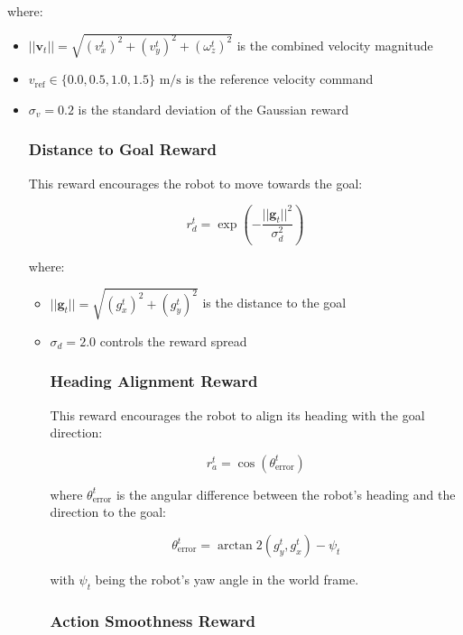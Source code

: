 \documentclass[12pt,a4paper]{article}
\begin{document}
where:
\begin{itemize}
\item $||\mathbf{v}_t|| = \sqrt{(v_x^t)^2 + (v_y^t)^2 + (\omega_z^t)^2}$ is the combined velocity magnitude
\item $v_{\text{ref}} \in \{0.0, 0.5, 1.0, 1.5\} \text{ m/s}$ is the reference velocity command
\item $\sigma_v = 0.2$ is the standard deviation of the Gaussian reward

\subsubsection{Distance to Goal Reward}

This reward encourages the robot to move towards the goal:

\begin{equation}
r_d^t = \exp\left( -\frac{||\mathbf{g}_t||^2}{\sigma_d^2} \right)
\end{equation}

where:
\begin{itemize}
\item $||\mathbf{g}_t|| = \sqrt{(g_x^t)^2 + (g_y^t)^2}$ is the distance to the goal
\item $\sigma_d = 2.0$ controls the reward spread

\subsubsection{Heading Alignment Reward}

This reward encourages the robot to align its heading with the goal direction:

\begin{equation}
r_a^t = \cos(\theta_{\text{error}}^t)
\end{equation}

where $\theta_{\text{error}}^t$ is the angular difference between the robot's heading and the direction to the goal:

\begin{equation}
\theta_{\text{error}}^t = \arctan2(g_y^t, g_x^t) - \psi_t
\end{equation}

with $\psi_t$ being the robot's yaw angle in the world frame.

\subsubsection{Action Smoothness Reward}


\end{itemize}
\end{itemize}
\end{document}
